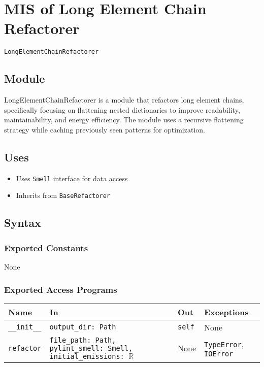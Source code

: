 \documentclass[12pt, titlepage]{article}
\begin{document}
\newpage  

\section{MIS of Long Element Chain Refactorer} \label{mis:lec}

\texttt{LongElementChainRefactorer}

\subsection{Module}

LongElementChainRefactorer is a module that refactors long element chains, specifically focusing on flattening nested dictionaries to improve readability, maintainability, and energy efficiency. The module uses a recursive flattening strategy while caching previously seen patterns for optimization.

\subsection{Uses}

\begin{itemize}
    \item Uses \texttt{Smell} interface for data access
    \item Inherits from \texttt{BaseRefactorer}
\end{itemize}

\subsection{Syntax}

\subsubsection{Exported Constants}
None

\subsubsection{Exported Access Programs}

\begin{center}
\begin{tabularx}{\linewidth}{|l|>{\raggedright\arraybackslash}X|l|l|}
\hline
\textbf{Name} & \textbf{In} & \textbf{Out} & \textbf{Exceptions} \\
\hline
\texttt{\_\_init\_\_} & \texttt{output\_dir: Path} & \texttt{self} & None \\
\hline
\texttt{refactor} & \texttt{file\_path: Path, pylint\_smell: Smell, initial\_emissions: $\mathbb{R}$} & None & \texttt{TypeError}, \texttt{IOError} \\
\hline
\end{tabularx}
\end{center}
\end{document}
